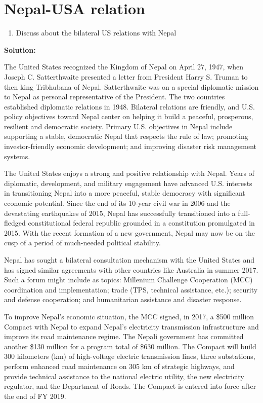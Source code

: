 \documentclass[
  openany]{book}
\providecommand{\tightlist}{%
  \setlength{\itemsep}{0pt}\setlength{\parskip}{0pt}}
\begin{document}
\hypertarget{nepal-usa-relation}{%
\section{Nepal-USA relation}\label{nepal-usa-relation}}

\begin{enumerate}
\def\labelenumi{\arabic{enumi}.}
\setcounter{enumi}{1}
\tightlist
\item
  Discuss about the bilateral US relations with Nepal
\end{enumerate}

\textbf{Solution:}

The United States recognized the Kingdom of Nepal on April 27, 1947, when Joseph C. Satterthwaite presented a letter from President Harry S. Truman to then king Tribhubana of Nepal. Satterthwaite was on a special diplomatic mission to Nepal as personal representative of the President. The two countries established diplomatic relations in 1948. Bilateral relations are friendly, and U.S. policy objectives toward Nepal center on helping it build a peaceful, prosperous, resilient and democratic society. Primary U.S. objectives in Nepal include supporting a stable, democratic Nepal that respects the rule of law; promoting investor-friendly economic development; and improving disaster risk management systems.

The United States enjoys a strong and positive relationship with Nepal. Years of diplomatic, development, and military engagement have advanced U.S. interests in transitioning Nepal into a more peaceful, stable democracy with significant economic potential. Since the end of its 10-year civil war in 2006 and the devastating earthquakes of 2015, Nepal has successfully transitioned into a full-fledged constitutional federal republic grounded in a constitution promulgated in 2015. With the recent formation of a new government, Nepal may now be on the cusp of a period of much-needed political stability.

Nepal has sought a bilateral consultation mechanism with the United States and has signed similar agreements with other countries like Australia in summer 2017. Such a forum might include as topics: Millenium Challenge Cooperation (MCC) coordination and implementation; trade (TPS, technical assistance, etc.); security and defense cooperation; and humanitarian assistance and disaster response.

To improve Nepal's economic situation, the MCC signed, in 2017, a \$500 million Compact with Nepal to expand Nepal's electricity transmission infrastructure and improve its road maintenance regime. The Nepali government has committed another \$130 million for a program total of \$630 million. The Compact will build 300 kilometers (km) of high-voltage electric transmission lines, three substations, perform enhanced road maintenance on 305 km of strategic highways, and provide technical assistance to the national electric utility, the new electricity regulator, and the Department of Roads. The Compact is entered into force after the end of FY 2019.
\end{document}
